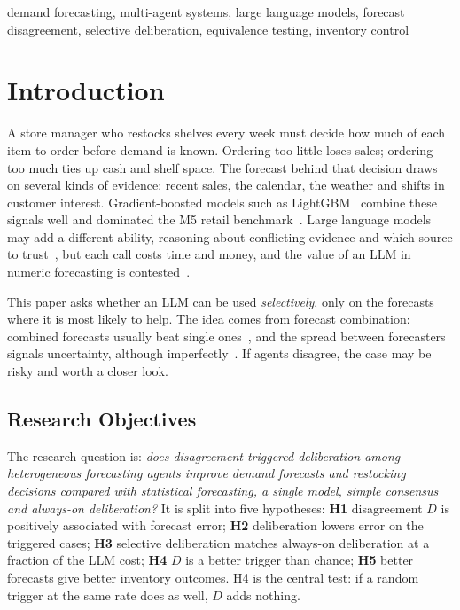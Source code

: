 \documentclass[conference]{IEEEtran}
\begin{document}
\begin{IEEEkeywords}
demand forecasting, multi-agent systems, large language models, forecast disagreement, selective
deliberation, equivalence testing, inventory control
\end{IEEEkeywords}

\section{Introduction}

A store manager who restocks shelves every week must decide how much of each item to order before
demand is known. Ordering too little loses sales; ordering too much ties up cash and shelf space.
The forecast behind that decision draws on several kinds of evidence: recent sales, the calendar,
the weather and shifts in customer interest. Gradient-boosted models such as LightGBM~\cite{ke2017}
combine these signals well and dominated the M5 retail benchmark~\cite{makridakis2022}. Large
language models may add a different ability, reasoning about conflicting evidence and which source
to trust~\cite{du2024}, but each call costs time and money, and the value of an LLM in numeric
forecasting is contested~\cite{tan2024}.

This paper asks whether an LLM can be used \emph{selectively}, only on the forecasts where it is most
likely to help. The idea comes from forecast combination: combined forecasts usually beat single
ones~\cite{bates1969,timmermann2006,wang2023}, and the spread between forecasters signals
uncertainty, although imperfectly~\cite{zarnowitz1987,whitaker1998}. If agents disagree, the case may
be risky and worth a closer look.

\subsection{Research Objectives}
The research question is: \emph{does disagreement-triggered deliberation among heterogeneous
forecasting agents improve demand forecasts and restocking decisions compared with statistical
forecasting, a single model, simple consensus and always-on deliberation?} It is split into five
hypotheses: \textbf{H1} disagreement $D$ is positively associated with forecast error; \textbf{H2}
deliberation lowers error on the triggered cases; \textbf{H3} selective deliberation matches always-on
deliberation at a fraction of the LLM cost; \textbf{H4} $D$ is a better trigger than chance;
\textbf{H5} better forecasts give better inventory outcomes. H4 is the central test: if a random
trigger at the same rate does as well, $D$ adds nothing.
\end{document}
